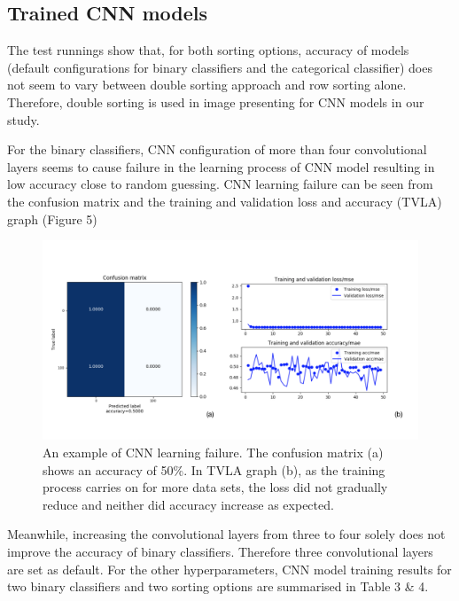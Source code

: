 \documentclass[a4paper,12pt,oneside]{extarticle}
\begin{document}
\subsection{Trained CNN models}
The test runnings show that, for both sorting options, accuracy of models (default configurations for binary classifiers and the categorical classifier) does not seem to vary between double sorting approach and row sorting alone. Therefore, double sorting is used in image presenting for CNN models in our study.
\par
For the binary classifiers, CNN configuration of more than four convolutional layers seems to cause failure in the learning process of CNN model resulting in low accuracy close to random guessing. CNN learning failure can be seen from the confusion matrix and the training and validation loss and accuracy (TVLA) graph (Figure 5) 
\begin{figure}[H] 
  \captionsetup{singlelinecheck = false, justification=justified}
  \centering
  \includegraphics[trim = 0 5mm 0 5mm, clip,width=1\textwidth]{figure5.png}
  \caption{An example of CNN learning failure. The confusion matrix (a) shows an accuracy of 50\%. In TVLA graph (b), as the training process carries on for more data sets, the loss did not gradually reduce and neither did accuracy increase as expected.}
\end{figure}

Meanwhile, increasing the convolutional layers from three to four solely does not improve the accuracy of binary classifiers. Therefore three convolutional layers are set as default. For the other hyperparameters, CNN model training results for two binary classifiers and two sorting options are summarised in Table 3 \& 4. 
\end{document}
